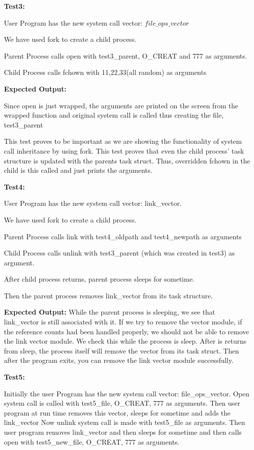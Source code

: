 \documentclass[11pt]{article}
\begin{document}
\medskip
\noindent
\textbf{Test3:} 

User Program has the new system call vector: $file\_ops\_vector$ 

We have used fork to create a child process. 

Parent Process calls open with test3\_parent, O\_CREAT and 777 as arguments. 

Child Process calls fchown with 11,22,33(all random) as arguments 

\noindent
\textbf{Expected Output: }

Since open is just wrapped, the arguments are printed on the screen from the wrapped function and original system call is called thus creating the file, test3\_parent

This test proves to be important as we are showing the functionality of system call inheritance by using fork. This test proves that even the child process' task structure is updated with the parents task struct. Thus, overridden fchown in the child is this called and just prints the arguments. 

\medskip
\noindent
\textbf{Test4:} 

User Program has the new system call vector: link\_vector. 

We have used fork to create a child process. 

Parent Process calls link with test4\_oldpath and test4\_newpath as arguments

Child Process calls unlink with test3\_parent (which was created in test3) as argument.

After child process returns, parent process sleeps for sometime. 

Then the parent process removes link\_vector from its task structure. 

\noindent
\textbf{Expected Output:} While the parent process is sleeping, we see that link\_vector is still associated with it. If we try to remove the vector module, if the reference counts had been handled properly, we should not be able to remove the link vector module. We check this while the process is sleep. After is returns from sleep, the process itself will remove the vector from its task struct. Then after the program exits, you can remove the link vector module successfully. 


\medskip
\noindent
\textbf{Test5: }

Initially the user Program has the new system call vector: file\_ops\_vector. Open system call is called with test5\_file, O\_CREAT, 777 as arguments. Then user program at run time removes this vector, sleeps for sometime and adds the link\_vector Now unlink system call is made with test5\_file as arguments. Then user program removes link\_vector and then sleeps for sometime and then calls open with test5\_new\_file, O\_CREAT, 777 as arguments. 
\end{document}
